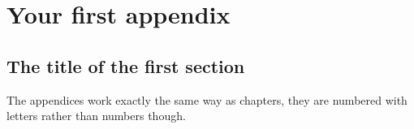 \chapter{Your first appendix}
\section{The title of the first section}
The appendices work exactly the same way as chapters, they are numbered with letters rather than numbers though.